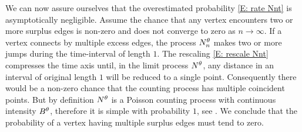 We can now assure ourselves that the overestimated probability \eqref{E: rate Nnt} is asymptotically negligible.
Assume the chance that any vertex encounters two or more surplus edges is non-zero and does not converge to zero as $n \rightarrow \infty$.
If a vertex connects by multiple excess edges, the process $N_n^{\theta}$ makes two or more jumps during the time-interval of length $1$.
The rescaling \eqref{E: rescale Nnt} compresses the time axis until, in the limit process $N^{\theta}$, 
any distance in an interval of original length $1$ will be reduced to a single point.
Consequently there would be a non-zero chance that the counting process has multiple coincident points.
But by definition $N^{\theta}$ is a Poisson counting process with continuous intensity $B^{\theta}$,
therefore it is simple with probability $1$, see \cite[Remark 2.1, p.34]{Haenggi.2013}.
We conclude that the probability of a vertex having multiple surplus edges must tend to zero.










